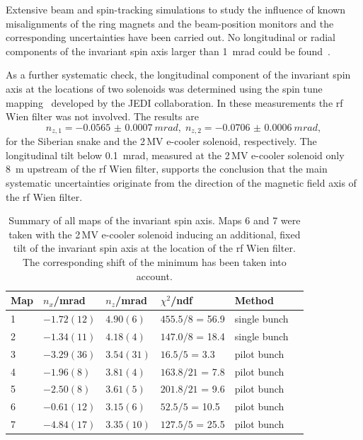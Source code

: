 \documentclass[
    10pt,
    twocolumn,
    secnumarabic,
    amssymb,
    nobibnotes,
    aps,
    prl,

    longbibliography,
    superscriptaddress
    ]{revtex4-2}
\begin{document}
Extensive beam and spin-tracking simulations to study the influence of known misalignments of the ring magnets and the beam-position monitors and the corresponding uncertainties
have been carried out.
No longitudinal or radial components of the invariant spin axis larger than \SI{1}{mrad} could be found~\cite{Vitz:998208}.

As a further systematic check, the longitudinal component of the invariant spin axis at the locations of two solenoids was determined using the spin tune mapping~\cite{PhysRevAccelBeams.20.072801} developed by the JEDI collaboration.
In these measurements the rf Wien filter was not involved.
The results are
\begin{equation}
  n_{z,1} = \SI{-0.0565(7)}{mrad}, \; n_{z,2} = \SI{-0.0706(6)}{mrad},
\end{equation}
for the Siberian snake and the 2\,MV e-cooler solenoid, respectively.
The longitudinal tilt below \SI{0.1}{mrad}, measured at the 2\,MV e-cooler solenoid only \SI{8}{m} upstream of the rf Wien filter, supports the conclusion that the main systematic uncertainties originate from the direction of the magnetic field axis of the rf Wien filter.

\begin{table}
\centering
\caption{Summary of all maps of the invariant spin axis. Maps 6 and 7 were taken with the 2\,MV e-cooler solenoid inducing an additional, fixed tilt of the invariant spin axis at the location of the rf Wien filter. The corresponding shift of the minimum has been taken into account.}
\begin{tabular}{llllll}
\toprule
Map & $n_x$/mrad & $n_z$/mrad & $\chi^2$/ndf & Method \\
\midrule
1 & $-1.72(12)$ & $4.90(6)$  & $455.5/8$ = 56.9 & single bunch\\
2 & $-1.34(11)$ & $4.18(4)$  & $147.0/8$ = 18.4 & single bunch\\
3 & $-3.29(36)$ & $3.54(31)$ & $16.5/5$ =  3.3 & pilot bunch \\
4 & $-1.96(8)$  & $3.81(4)$  & $163.8/21$ = 7.8 & pilot bunch \\
5 & $-2.50(8)$  & $3.61(5)$  & $201.8/21$ = 9.6 & pilot bunch \\
6 & $-0.61(12)$ & $3.15(6)$  & $52.5/5$ = 10.5 & pilot bunch \\
7 & $-4.84(17)$ & $3.35(10)$ & $127.5/5$ = 25.5 & pilot bunch \\
\bottomrule
\end{tabular}
\label{tab:all_results}
\end{table}
\end{document}
